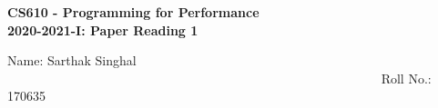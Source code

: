 \documentclass[20pt]{letter}
\begin{document}
\begin{center}
{\LARGE \textbf{
CS610 - Programming for Performance\\
2020-2021-I: Paper Reading 1
}}\end{center}

{\Large
Name: Sarthak Singhal        ~~~~~~~~~~~~~~~~~~~~~~~~~~~~~~~~~~~~~~~~~~~~~~~~~~~~~~~~~~   Roll No.: 170635}



\end{document}
